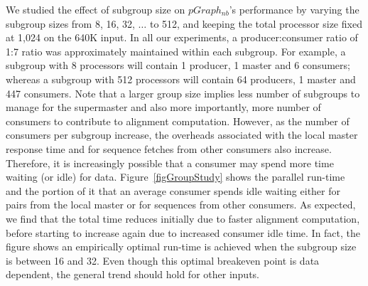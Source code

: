 \documentclass[10pt,journal,letterpaper,compsoc]{IEEEtran}
\begin{document}
We studied the effect of subgroup size on $pGraph_{nb}$'s performance by varying the subgroup sizes from 8, 16, 32, $\ldots$ to  512, and keeping the total processor size fixed at 1,024 on the 640K input. In all our experiments, a producer:consumer ratio of 1:7 ratio was approximately maintained within each subgroup. For example, a subgroup with 8 processors will contain 1 producer, 1 master and 6 consumers; whereas a subgroup with 512 processors will contain 64 producers, 1 master and 447 consumers. Note that a larger group size implies less number of subgroups to manage for the supermaster and also more importantly, more number of consumers to contribute to alignment computation. However, as the number of consumers per subgroup increase, the overheads associated with the local master response time and for sequence fetches from other consumers also increase. Therefore, it is increasingly possible that a consumer may spend more time waiting (or idle) for data.  Figure~\ref{figGroupStudy} shows the parallel run-time and the portion of it that an average consumer spends idle waiting either for pairs from the local master or for sequences from other consumers. As expected, we find that the total time reduces initially due to faster alignment computation, before starting to increase again due to increased consumer idle time. In fact, the figure shows an empirically optimal run-time is achieved when the subgroup size is between 16 and 32. Even though this optimal breakeven point is data dependent, the general trend should hold for other inputs.
\end{document}
